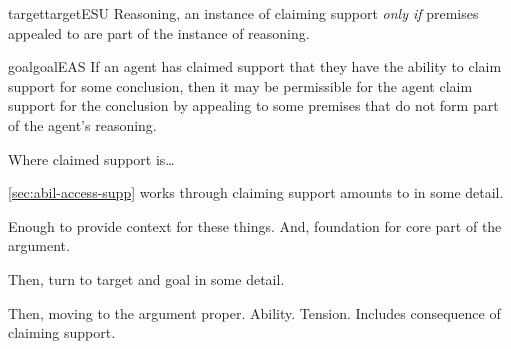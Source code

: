 \begin{note}
  \begin{restatable}[\ESU{-} --- \ESU{}]{target}{targetESU}
    \label{denied-claim}
    Reasoning, an instance of claiming support \emph{only if} premises appealed to are part of the instance of reasoning.
  \end{restatable}
\end{note}

\begin{note}
  \begin{restatable}[\EAS{-} --- \EAS{}]{goal}{goalEAS}
    \label{prop:EAS}
    If an agent has claimed support that they have the ability to claim support for some conclusion, then it may be permissible for the agent claim support for the conclusion by appealing to some premises that do not form part of the agent's reasoning.
  \end{restatable}
\end{note}

\begin{note}
  Where claimed support is\dots
\end{note}

\begin{note}
  \autoref{sec:abil-access-supp} works through claiming support amounts to in some detail.

  Enough to provide context for these things.
  And, foundation for core part of the argument.

  Then, turn to target and goal in some detail.

  Then, moving to the argument proper.
  Ability.
  Tension.
  Includes consequence of claiming support.
\end{note}

